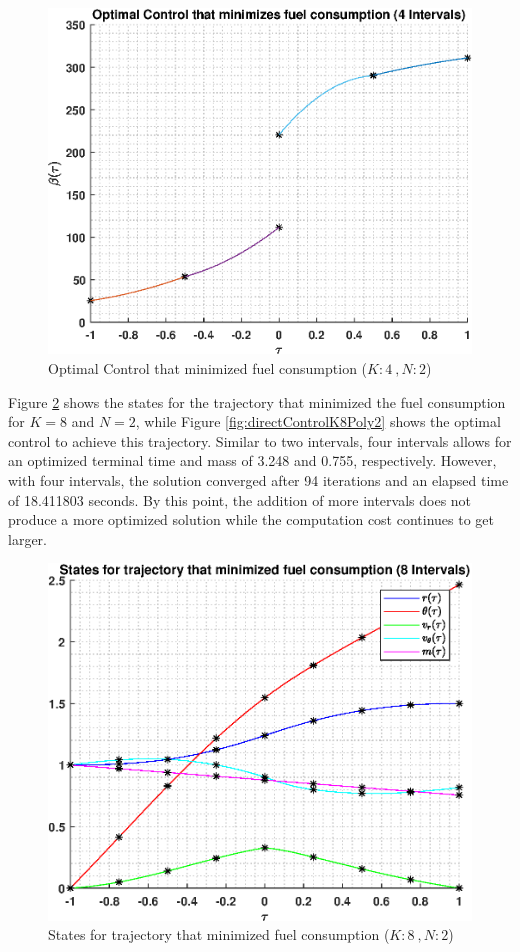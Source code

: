 \documentclass[]{article}
\begin{document}
\begin{figure}
	\centering
	\includegraphics[scale=0.75]{directControlK4Poly2.eps}
	\caption{Optimal Control that minimized fuel consumption (\(K:4\ , N:2\))}
	\label{fig:directControlK4Poly2}
\end{figure}
\vspace{2mm}\newline 
Figure \ref{fig:directStatesK8Poly2} shows the states for the trajectory that minimized the fuel consumption for \(K = 8\) and  \(N = 2\), while Figure \ref{fig:directControlK8Poly2} shows the optimal control to achieve this trajectory. Similar to two intervals, four intervals allows for an optimized terminal time and mass of 3.248 and 0.755, respectively. However, with four intervals, the solution converged after 94 iterations and an elapsed time of 18.411803 seconds. By this point, the addition of more intervals does not produce a more optimized solution while the computation cost continues to get larger.
\begin{figure}
	\centering
	\includegraphics[scale=0.75]{directStatesK8Poly2.eps}
	\caption{States for trajectory that minimized fuel consumption (\(K:8\ , N:2\))}
	\label{fig:directStatesK8Poly2}
\end{figure}
\end{document}
